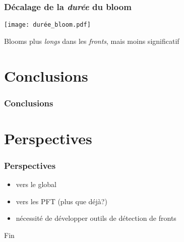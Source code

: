 
\begin{frame}
  \frametitle{Décalage de la \emph{\textit{durée}} du bloom}
  \texttt{[image: durée\_bloom.pdf]}

  \vfill

  Blooms plus \emph{longs} dans les \emph{fronts}, mais moins significatif
\end{frame}


\section{Conclusions}

\begin{frame}
  \frametitle{Conclusions}

\end{frame}


\section{Perspectives}
\begin{frame}
  \frametitle{Perspectives}

  \begin{itemize}
    \item vers le global
    \item vers les PFT (plus que déjà?)
    \item nécessité de développer outils de détection de fronts
  \end{itemize}

\end{frame}


\begin{frame}
  Fin
\end{frame}


